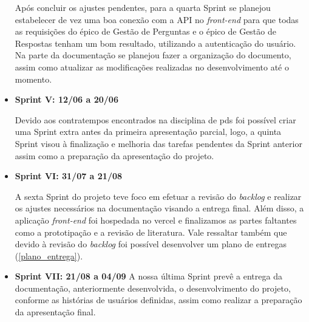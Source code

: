 \begin{itemize}
Após concluir os ajustes pendentes, para a quarta \gls{Sprint} se planejou estabelecer de vez uma boa conexão com a API no \textsl{\gls{front-end}} para que todas as requisições do épico de Gestão de Perguntas e o épico de Gestão de Respostas tenham um bom resultado, utilizando a autenticação do usuário. Na parte da documentação se planejou fazer a organização do documento, assim como atualizar as modificações realizadas no desenvolvimento até o momento. 
\item {\textbf{Sprint V: 12/06 a 20/06}}

Devido aos contratempos encontrados na disciplina de \acs{pds} foi possível criar uma \gls{Sprint} extra antes da primeira apresentação parcial, logo, a quinta \gls{Sprint} visou à finalização e melhoria das tarefas pendentes da \gls{Sprint} anterior assim como a preparação da apresentação do projeto. 
\item \textbf{{Sprint VI: 31/07 a 21/08}}

A sexta \gls{Sprint} do projeto teve foco em efetuar a revisão do \textit{backlog} e realizar os ajustes necessários na documentação visando a entrega final. Além disso, a aplicação \textsl{\gls{front-end}} foi hospedada no \gls{vercel} e finalizamos as partes faltantes como a prototipação e a revisão de literatura. Vale ressaltar também que devido à revisão do \textit{backlog} foi possível desenvolver um plano de entregas (\autoref{plano_entrega}).
\item \textbf{{Sprint VII: 21/08 a 04/09}}
A nossa última \gls{Sprint} prevê a entrega da documentação, anteriormente desenvolvida, o desenvolvimento do projeto, conforme as histórias de usuários definidas, assim como realizar a preparação da apresentação final. 
\end{itemize}


